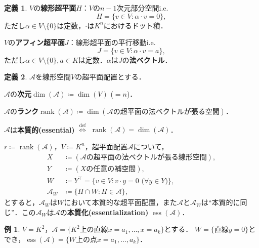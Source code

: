 \documentclass[xelatex,ja=standard,a4paper,14pt,everyparhook=compat]{bxjsarticle}
\newcommand{\mcA}{\mathcal{A}}
\DeclareMathOperator{\rank}{rank}
\DeclareMathOperator{\ess}{ess}
\theoremstyle{definition}
\newtheorem*{example*}{例}
\newtheorem*{definition*}{定義}
\begin{document}
\begin{definition*}
    $V$の\textbf{線形超平面}$H$：$V$の$n-1$次元部分空間i.e. \begin{equation*}
        H = \{v \in V : \alpha \cdot v = 0\},
    \end{equation*}
    ただし$\alpha \in V \setminus \{0\}$は定数，$\cdot$は$K^n$におけるドット積．

    $V$の\textbf{アフィン超平面}$J$：線形超平面の平行移動i.e. \begin{equation*}
        J = \{v \in V : \alpha \cdot v = a\},
    \end{equation*}
    ただし$\alpha \in V \setminus \{0\}, a \in K$は定数．$\alpha$は$J$の\textbf{法ベクトル}．
\end{definition*}

\begin{definition*}
    $\mcA$を線形空間$V$の超平面配置とする．

    $\mcA$の\textbf{次元}$\dim(\mcA) \coloneqq \dim(V)$ ($=n$)．

    $\mcA$の\textbf{ランク}$\rank(\mcA) \coloneqq \dim(\text{$\mcA$の超平面の法ベクトルが張る空間})$．

    $\mcA$は\textbf{本質的(essential)} $\overset{\mathrm{def}}{\Longleftrightarrow}$ $\rank(\mcA) = \dim(\mcA)$．
\end{definition*}

\newpage

$r \coloneqq \rank(\mcA)$，$V \coloneqq K^n$，超平面配置$\mcA$について， \begin{align*}
    X      & \coloneqq (\text{$\mcA$の超平面の法ベクトルが張る線形空間}),                 \\
    Y      & \coloneqq (\text{$X$の任意の補空間}),                                        \\
    W      & \coloneqq Y^\top = \{v \in V : \text{$v \cdot y = 0$ ($\forall y \in Y$)}\}, \\
    \mcA_W & \coloneqq \{H \cap W : H \in \mcA\},
\end{align*}
とすると，$\mcA_W$は$W$において本質的な超平面配置，また$\mcA$と$\mcA_W$は``本質的に同じ''．この$\mcA_W$は$\mcA$の\textbf{本質化(essentialization)} $\ess(\mcA)$．

\begin{example*}
    $V = K^2$，$\mcA = \{\text{$K^2$上の直線$x=a_1, \ldots, x=a_k$}\}$とする．
    $W = \{\text{直線$y=0$}\}$とでき，$\ess(\mcA) = \{\text{$W$上の点$x=a_1,\ldots,a_k$}\}$．
\end{example*}
\end{document}
